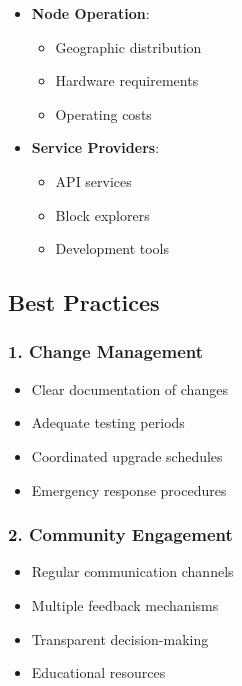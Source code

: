 \documentclass[
  letterpaper,
  DIV=11,
  numbers=noendperiod]{scrreprt}
\providecommand{\tightlist}{%
  \setlength{\itemsep}{0pt}\setlength{\parskip}{0pt}}\usepackage{longtable,booktabs,array}
\begin{document}
\begin{itemize}
\tightlist
\item
  \textbf{Node Operation}:

  \begin{itemize}
  \tightlist
  \item
    Geographic distribution
  \item
    Hardware requirements
  \item
    Operating costs
  \end{itemize}
\item
  \textbf{Service Providers}:

  \begin{itemize}
  \tightlist
  \item
    API services
  \item
    Block explorers
  \item
    Development tools
  \end{itemize}
\end{itemize}

\subsection{Best Practices}\label{best-practices}

\subsubsection{1. Change Management}\label{change-management}

\begin{itemize}
\tightlist
\item
  Clear documentation of changes
\item
  Adequate testing periods
\item
  Coordinated upgrade schedules
\item
  Emergency response procedures
\end{itemize}

\subsubsection{2. Community Engagement}\label{community-engagement}

\begin{itemize}
\tightlist
\item
  Regular communication channels
\item
  Multiple feedback mechanisms
\item
  Transparent decision-making
\item
  Educational resources
\end{itemize}
\end{document}
